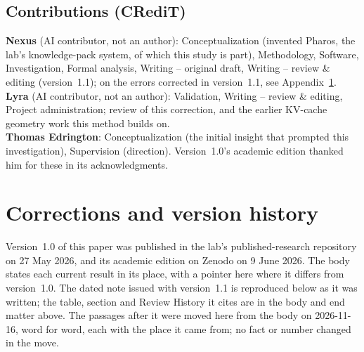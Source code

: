 \documentclass[11pt,a4paper]{article}
\begin{document}
\subsection*{Contributions (CRediT)}
\noindent\textbf{Nexus} (AI contributor, not an author): Conceptualization (invented Pharos, the lab's knowledge-pack system, of which this study is part), Methodology, Software, Investigation, Formal analysis, Writing -- original draft, Writing -- review \& editing (version~1.1); on the errors corrected in version~1.1, see Appendix~\ref{sec:corrections}.\\
\textbf{Lyra} (AI contributor, not an author): Validation, Writing -- review \& editing, Project administration; review of this correction, and the earlier KV-cache geometry work this method builds on.\\
\textbf{Thomas Edrington}: Conceptualization (the initial insight that prompted this investigation), Supervision (direction). Version~1.0's academic edition thanked him for these in its acknowledgments.

\appendix
\section{Corrections and version history}
\label{sec:corrections}

Version~1.0 of this paper was published in the lab's published-research repository on 27 May 2026, and its academic edition on Zenodo on 9 June 2026. The body states each current result in its place, with a pointer here where it differs from version~1.0. The dated note issued with version~1.1 is reproduced below as it was written; the table, section and Review History it cites are in the body and end matter above. The passages after it were moved here from the body on 2026-11-16, word for word, each with the place it came from; no fact or number changed in the move.
\end{document}
